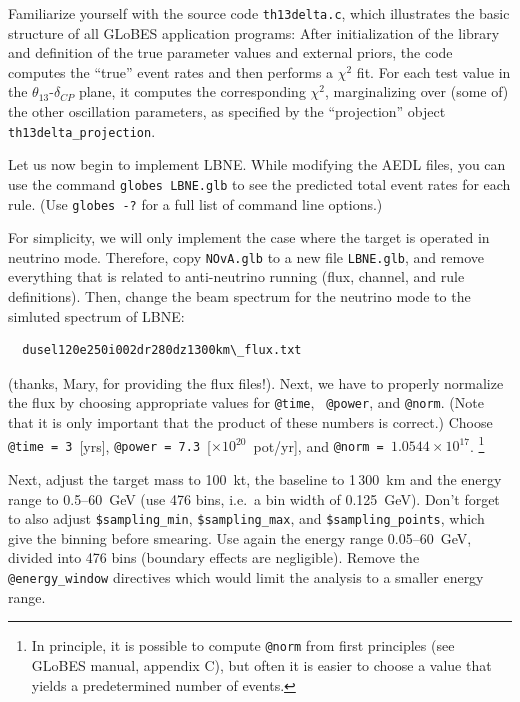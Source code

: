 \documentclass[12pt,a4paper]{article}
\newcommand{\aufg}[2]{\vspace{4mm}{\bf\underline{Task #1:} {#2}} \vspace{3mm}}
\theoremstyle{dotless}
\begin{document}
Familiarize yourself with the source code {\tt th13delta.c}, which
illustrates the basic structure of all GLoBES application programs:
After initialization of the library and definition of the true parameter
values and external priors, the code computes the ``true'' event rates
and then performs a $\chi^2$ fit. For each test value in the $\theta_{13}$-$\delta_{CP}$
plane, it computes the corresponding $\chi^2$, marginalizing over (some of) the other
oscillation parameters, as specified by the ``projection'' object
{\tt th13delta\_projection}.


\aufg{2}{Implenting the basic parameters of LBNE}

Let us now begin to implement LBNE. While modifying the AEDL files, you can use
the command {\tt globes LBNE.glb} to see the predicted total event rates for
each rule.  (Use {\tt globes -?} for a full list of command line options.)

For simplicity, we will only implement the case where the target is operated in
neutrino mode.  Therefore, copy {\tt NOvA.glb} to a new file {\tt LBNE.glb},
and remove everything that is related to anti-neutrino running (flux, channel,
and rule definitions).  Then, change the beam spectrum for the neutrino mode to
the simluted spectrum of LBNE:
\begin{verbatim}
  dusel120e250i002dr280dz1300km\_flux.txt
\end{verbatim}
(thanks, Mary, for providing the flux files!).  Next, we have to properly
normalize the flux by choosing appropriate values for {\tt @time}, {\tt
@power}, and {\tt @norm}. (Note that it is only important that the product of
these numbers is correct.) Choose {\tt @time = 3}~[yrs], {\tt @power =
7.3}~[$\times 10^{20}$~pot/yr], and {\tt @norm = $1.0544 \times 10^{17}$}.%
\footnote{In principle, it is possible to compute {\tt @norm}
from first principles (see GLoBES manual, appendix C), but often it is easier
to choose a value that yields a predetermined number of events.}

Next, adjust the target mass to 100~kt, the baseline to 1\,300~km and the
energy range to 0.5--60~GeV (use 476 bins, i.e.\ a bin width of 0.125~GeV).
Don't forget to also adjust {\tt \$sampling\_min}, {\tt \$sampling\_max}, and
{\tt \$sampling\_points}, which give the binning before smearing. Use again the
energy range 0.05--60~GeV, divided into 476 bins (boundary effects are
negligible). Remove the {\tt @energy\_window} directives which would limit the
analysis to a smaller energy range.
\end{document}

